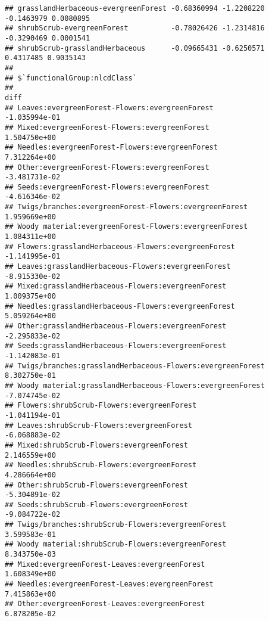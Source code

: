 \documentclass[
]{article}
\begin{document}
\begin{verbatim}
## grasslandHerbaceous-evergreenForest -0.68360994 -1.2208220 -0.1463979 0.0080895
## shrubScrub-evergreenForest          -0.78026426 -1.2314816 -0.3290469 0.0001541
## shrubScrub-grasslandHerbaceous      -0.09665431 -0.6250571  0.4317485 0.9035143
## 
## $`functionalGroup:nlcdClass`
##                                                                                diff
## Leaves:evergreenForest-Flowers:evergreenForest                        -1.035994e-01
## Mixed:evergreenForest-Flowers:evergreenForest                          1.504750e+00
## Needles:evergreenForest-Flowers:evergreenForest                        7.312264e+00
## Other:evergreenForest-Flowers:evergreenForest                         -3.481731e-02
## Seeds:evergreenForest-Flowers:evergreenForest                         -4.616346e-02
## Twigs/branches:evergreenForest-Flowers:evergreenForest                 1.959669e+00
## Woody material:evergreenForest-Flowers:evergreenForest                 1.084311e+00
## Flowers:grasslandHerbaceous-Flowers:evergreenForest                   -1.141995e-01
## Leaves:grasslandHerbaceous-Flowers:evergreenForest                    -8.915330e-02
## Mixed:grasslandHerbaceous-Flowers:evergreenForest                      1.009375e+00
## Needles:grasslandHerbaceous-Flowers:evergreenForest                    5.059264e+00
## Other:grasslandHerbaceous-Flowers:evergreenForest                     -2.295833e-02
## Seeds:grasslandHerbaceous-Flowers:evergreenForest                     -1.142083e-01
## Twigs/branches:grasslandHerbaceous-Flowers:evergreenForest             8.302750e-01
## Woody material:grasslandHerbaceous-Flowers:evergreenForest            -7.074745e-02
## Flowers:shrubScrub-Flowers:evergreenForest                            -1.041194e-01
## Leaves:shrubScrub-Flowers:evergreenForest                             -6.068883e-02
## Mixed:shrubScrub-Flowers:evergreenForest                               2.146559e+00
## Needles:shrubScrub-Flowers:evergreenForest                             4.286664e+00
## Other:shrubScrub-Flowers:evergreenForest                              -5.304891e-02
## Seeds:shrubScrub-Flowers:evergreenForest                              -9.084722e-02
## Twigs/branches:shrubScrub-Flowers:evergreenForest                      3.599583e-01
## Woody material:shrubScrub-Flowers:evergreenForest                      8.343750e-03
## Mixed:evergreenForest-Leaves:evergreenForest                           1.608349e+00
## Needles:evergreenForest-Leaves:evergreenForest                         7.415863e+00
## Other:evergreenForest-Leaves:evergreenForest                           6.878205e-02

\end{verbatim}
\end{document}
